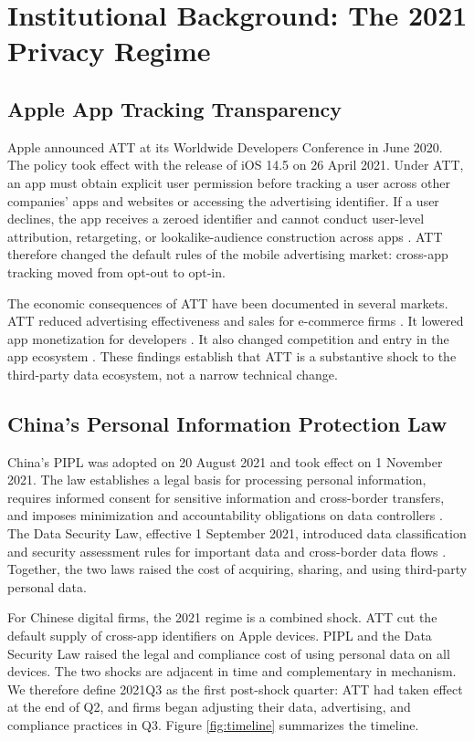 \section{Institutional Background: The 2021 Privacy Regime}
\label{sec:institution}

\subsection{Apple App Tracking Transparency}

Apple announced ATT at its Worldwide Developers Conference in June 2020. The policy took effect with the release of iOS 14.5 on 26 April 2021. Under ATT, an app must obtain explicit user permission before tracking a user across other companies' apps and websites or accessing the advertising identifier. If a user declines, the app receives a zeroed identifier and cannot conduct user-level attribution, retargeting, or lookalike-audience construction across apps \cite{apple2020}. ATT therefore changed the default rules of the mobile advertising market: cross-app tracking moved from opt-out to opt-in.

The economic consequences of ATT have been documented in several markets. ATT reduced advertising effectiveness and sales for e-commerce firms \cite{aridor2024}. It lowered app monetization for developers \cite{kesler2023}. It also changed competition and entry in the app ecosystem \cite{cheyre2024}. These findings establish that ATT is a substantive shock to the third-party data ecosystem, not a narrow technical change.

\subsection{China's Personal Information Protection Law}

China's PIPL was adopted on 20 August 2021 and took effect on 1 November 2021. The law establishes a legal basis for processing personal information, requires informed consent for sensitive information and cross-border transfers, and imposes minimization and accountability obligations on data controllers \cite{pipl2021}. The Data Security Law, effective 1 September 2021, introduced data classification and security assessment rules for important data and cross-border data flows \cite{dsl2021}. Together, the two laws raised the cost of acquiring, sharing, and using third-party personal data.

For Chinese digital firms, the 2021 regime is a combined shock. ATT cut the default supply of cross-app identifiers on Apple devices. PIPL and the Data Security Law raised the legal and compliance cost of using personal data on all devices. The two shocks are adjacent in time and complementary in mechanism. We therefore define 2021Q3 as the first post-shock quarter: ATT had taken effect at the end of Q2, and firms began adjusting their data, advertising, and compliance practices in Q3. Figure \ref{fig:timeline} summarizes the timeline.

